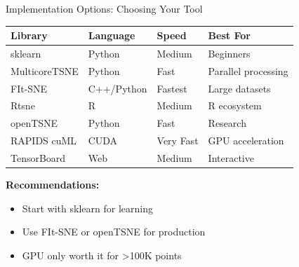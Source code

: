 \documentclass[aspectratio=169]{beamer}
\begin{document}
\begin{frame}{Implementation Options: Choosing Your Tool}
\begin{center}
\begin{tabular}{l|l|l|l}
\textbf{Library} & \textbf{Language} & \textbf{Speed} & \textbf{Best For}\\
\hline
sklearn & Python & Medium & Beginners\\
MulticoreTSNE & Python & Fast & Parallel processing\\
FIt-SNE & C++/Python & Fastest & Large datasets\\
Rtsne & R & Medium & R ecosystem\\
openTSNE & Python & Fast & Research\\
RAPIDS cuML & CUDA & Very Fast & GPU acceleration\\
TensorBoard & Web & Medium & Interactive
\end{tabular}
\end{center}

\vspace{0.3cm}
\textbf{Recommendations:}
\begin{itemize}
\item Start with sklearn for learning
\item Use FIt-SNE or openTSNE for production
\item GPU only worth it for >100K points
\end{itemize}
\end{frame}
\end{document}
